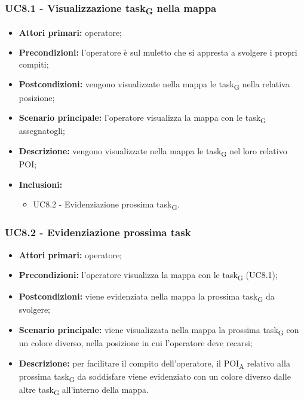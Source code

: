 \subsubsection{UC8.1 - Visualizzazione \gls{task}\textsubscript{G} nella mappa}
\begin{itemize}
	\item 	\textbf{Attori primari:} operatore;
	\item 	\textbf{Precondizioni:} l'operatore è sul muletto che si appresta a svolgere i propri compiti;
	\item 	\textbf{Postcondizioni:} vengono visualizzate nella mappa le \gls{task}\textsubscript{G} nella relativa posizione;
	\item 	\textbf{Scenario principale:} l'operatore visualizza la mappa con le \gls{task}\textsubscript{G} assegnatogli;
	\item 	\textbf{Descrizione:} vengono visualizzate nella mappa le \gls{task}\textsubscript{G} nel loro relativo POI;
	\item 	\textbf{Inclusioni:}
	\begin{itemize}
		\item UC8.2 - Evidenziazione prossima \gls{task}\textsubscript{G}.
	\end{itemize}
\end{itemize}

\subsubsection{UC8.2 - Evidenziazione prossima task}
\begin{itemize}
	\item 	\textbf{Attori primari:} operatore;
	\item 	\textbf{Precondizioni:} l'operatore visualizza la mappa con le \gls{task}\textsubscript{G} (UC8.1);
	\item 	\textbf{Postcondizioni:} viene evidenziata nella mappa la prossima \gls{task}\textsubscript{G} da svolgere;
	\item 	\textbf{Scenario principale:} viene visualizzata nella mappa la prossima \gls{task}\textsubscript{G} con un colore diverso, nella posizione in cui l'operatore deve recarsi;
	\item 	\textbf{Descrizione:} per facilitare il compito dell'operatore, il  \acrshort{POI}\textsubscript{A} relativo alla prossima \gls{task}\textsubscript{G} da soddisfare viene evidenziato con un colore diverso dalle altre \gls{task}\textsubscript{G} all'interno della mappa.

\end{itemize}

